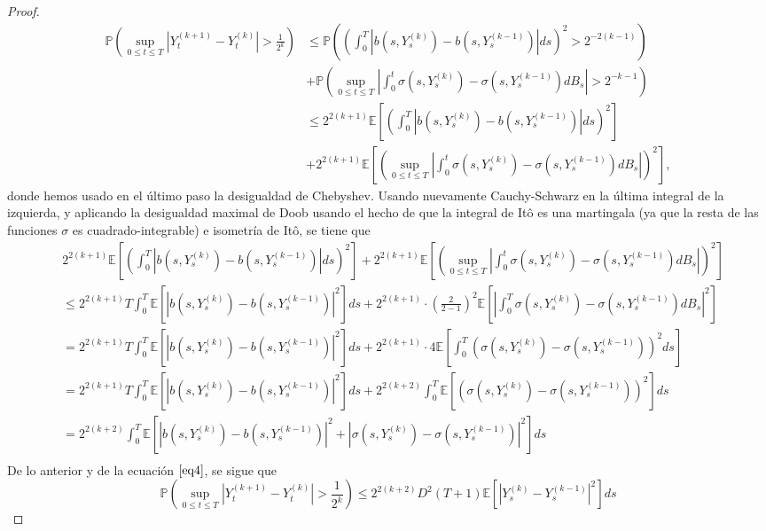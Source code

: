 \documentclass[letterpaper]{article}
\newcommand{\abs}[1]{\left\lvert #1 \right\rvert}
\newcommand{\E}{\mathbb{E}}
\renewcommand{\P}{\mathbb{P}}
\newcommand{\1}{\mathds{1}}
\theoremstyle{definition}
\theoremstyle{definition}
\theoremstyle{definition}
\theoremstyle{definition}
\theoremstyle{definition}
\begin{document}
\begin{enumerate}
\begin{proof}
        \begin{align*}
            \P\left(\sup_{0\leq t\leq T}|Y_t^{(k+1)}-Y_t^{(k)}|>\frac{1}{2^{k}}\right)&\leq \P\left(\left(\int_{0}^{T}|b(s,Y_s^{(k)})-b(s,Y_s^{(k-1)})|ds\right)^2>2^{-2(k-1)}\right)\\
            &+\P\left(\sup_{0\leq t\leq T}\abs{\int_{0}^{t}\sigma(s,Y_s^{(k)})-\sigma(s,Y_s^{(k-1)})dB_s}>2^{-k-1}\right)\\
            &\leq 2^{2(k+1)}\E\left[\left(\int_{0}^{T}|b(s,Y_s^{(k)})-b(s,Y_s^{(k-1)})|ds\right)^2\right]\\
            &+2^{2(k+1)}\E\left[\left(\sup_{0\leq t\leq T}\abs{\int_{0}^{t}\sigma(s,Y_s^{(k)})-\sigma(s,Y_s^{(k-1)})dB_s}\right)^2\right],
        \end{align*}
        donde hemos usado en el último paso la desigualdad de Chebyshev. Usando nuevamente Cauchy-Schwarz en la última integral de la izquierda, y aplicando 
        la desigualdad maximal de Doob usando el hecho de que la integral de Itô es una martingala (ya que la resta de las funciones $\sigma$ es cuadrado-integrable) e isometría de Itô, se tiene que 
        \begin{align*}
            &2^{2(k+1)}\E\left[\left(\int_{0}^{T}|b(s,Y_s^{(k)})-b(s,Y_s^{(k-1)})|ds\right)^2\right]+2^{2(k+1)}\E\left[\left(\sup_{0\leq t\leq T}\abs{\int_{0}^{t}\sigma(s,Y_s^{(k)})-\sigma(s,Y_s^{(k-1)})dB_s}\right)^2\right]\\
            &\leq 2^{2(k+1)}T \int_{0}^T\E\left[|b(s,Y_s^{(k)})-b(s,Y_s^{(k-1)})|^2\right]ds+2^{2(k+1)}\cdot\left(\frac{2}{2-1}\right)^2 \E\left[\abs{\int_{0}^{T}\sigma(s,Y_s^{(k)})-\sigma(s,Y_s^{(k-1)})dB_s}^2\right]\\
            &=2^{2(k+1)}T \int_{0}^T\E\left[|b(s,Y_s^{(k)})-b(s,Y_s^{(k-1)})|^2\right]ds+2^{2(k+1)}\cdot4 \E\left[\int_{0}^{T}\left(\sigma(s,Y_s^{(k)})-\sigma(s,Y_s^{(k-1)})\right)^2ds\right]\\
            &=2^{2(k+1)}T \int_{0}^T\E\left[|b(s,Y_s^{(k)})-b(s,Y_s^{(k-1)})|^2\right]ds+2^{2(k+2)}\int_{0}^{T}\E\left[\left(\sigma(s,Y_s^{(k)})-\sigma(s,Y_s^{(k-1)})\right)^2\right]ds\\
            &=2^{2(k+2)}\int_{0}^T\E\left[|b(s,Y_s^{(k)})-b(s,Y_s^{(k-1)})|^2+|\sigma(s,Y_s^{(k)})-\sigma(s,Y_s^{(k-1)})|^2\right]ds\\
        \end{align*}
            De lo anterior y de la ecuación $\eqref{eq4}$, se sigue que 
            \[
                \P\left(\sup_{0\leq t\leq T}|Y_t^{(k+1)}-Y_t^{(k)}|>\frac{1}{2^{k}}\right)\leq 2^{2(k+2)}D^2(T+1)\E\left[\abs{Y_s^{(k)}-Y_s^{(k-1)}}^2\right]ds
\]
\end{proof}
\end{enumerate}
\end{document}
